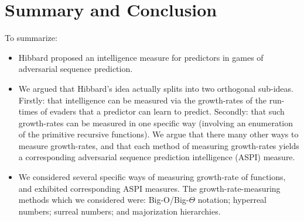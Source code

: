 \documentclass{article}
\begin{document}
\section{Summary and Conclusion}
\label{conclusionsection}

To summarize:
\begin{itemize}
    \item
    Hibbard proposed \cite{hibbard} an intelligence measure for predictors
    in games of adversarial sequence prediction.
    \item
    We argued that Hibbard's idea actually splits into two orthogonal sub-ideas.
    Firstly: that intelligence can be measured via the growth-rates of the run-times
    of evaders that a predictor can learn to predict. Secondly: that such growth-rates can
    be measured in one specific way (involving an enumeration of the primitive recursive
    functions). We argue that there many other ways to measure growth-rates,
    and that each method of measuring growth-rates yields a corresponding
    adversarial sequence prediction intelligence (ASPI) measure.
    \item
    We considered several specific ways of measuring growth-rate of functions, and exhibited
    corresponding ASPI measures. The growth-rate-measuring methods
    which we considered were: Big-O/Big-$\Theta$ notation; hyperreal numbers;
    surreal numbers; and majorization hierarchies.
\end{itemize}




\end{document}

